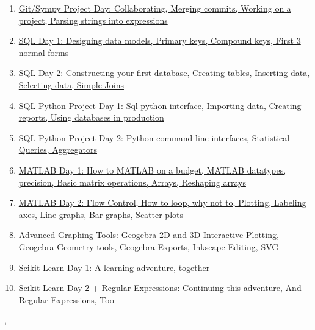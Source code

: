 \documentclass[11pt]{article}
\renewcommand{\today}{\shortmonthname[\the\month] \the \day,  \the\year}
\begin{document}
\begin{enumerate}
	\item \href{https://mp.weixin.qq.com/s/GS97MTxA6nnzFVdCyjsYVQ}{Git/Sympy Project Day: Collaborating, Merging commits, Working on a project, Parsing strings into expressions}	%
	\item \href{https://mp.weixin.qq.com/s/pO_BkS0eKX34e6120HjONA}{SQL Day 1: Designing data models, Primary keys, Compound keys, First 3 normal forms}	%
	\item \href{https://mp.weixin.qq.com/s/xeVhlYACL2zYKjippTYJJg}{SQL Day 2: Constructing your first database, Creating tables, Inserting data, Selecting data, Simple Joins}	%
	\item \href{https://mp.weixin.qq.com/s/EIIFpuWDRXSFaRkWEdiqOA}{SQL-Python Project Day 1: Sql python interface, Importing data, Creating reports, Using databases in production}	%
	\item \href{https://mp.weixin.qq.com/s/ae7Lo1dJ_lHHpcxZtHr_dg}{SQL-Python Project Day 2: Python command line interfaces, Statistical Queries, Aggregators}	%
	\item \href{https://mp.weixin.qq.com/s/QniccPmEcjmpA5iqXEkcuw}{MATLAB Day 1: How to MATLAB on a budget, MATLAB datatypes, precision, Basic matrix operations, Arrays, Reshaping arrays}	%
	\item \href{https://mp.weixin.qq.com/s/r4LLYLxK35iMaB8BzZsjEw}{MATLAB Day 2: Flow Control, How to loop, why not to, Plotting, Labeling axes, Line graphs, Bar graphs, Scatter plots}	%
	\item \href{https://mp.weixin.qq.com/s/zDxTP3FnAO_kRTlvNOP52A}{Advanced Graphing Tools: Geogebra 2D and 3D Interactive Plotting, Geogebra Geometry tools, Geogebra Exports, Inkscape Editing, SVG}	%
	\item \href{https://mp.weixin.qq.com/s/VsEu9ecJdtuT2lFarRUsaw}{Scikit Learn Day 1: A learning adventure, together}	%
	\item \href{https://mp.weixin.qq.com/s/E7KNRI7adCeSqlvCBMYx5A}{Scikit Learn Day 2 + Regular Expressions: Continuing this adventure, And Regular Expressions, Too}	%
\end{enumerate}




%
\begin{flushright}
	\tiny \today 
\end{flushright}
\end{document}
